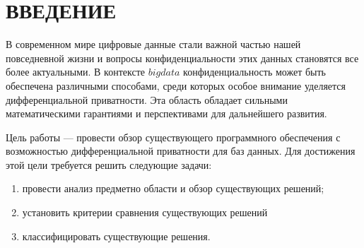 \chapter*{ВВЕДЕНИЕ}
 В современном мире цифровые данные стали важной частью нашей повседневной жизни и вопросы конфиденциальности этих данных становятся все более актуальными.
 В контексте $big data$ конфиденциальность может быть обеспечена различными способами, среди которых особое внимание уделяется дифференциальной приватности.
 Эта область обладает сильными математическими гарантиями и перспективами для дальнейшего развития.
 
Цель работы --- провести обзор существующего программного обеспечения с возможностью
дифференциальной приватности для баз данных.
Для достижения этой цели требуется решить следующие задачи:
\begin{enumerate}[label*=---]
	\item провести анализ предметно области и обзор существующих решений;
	\item установить критерии сравнения существующих решений
	\item классифицировать существующие решения.
\end{enumerate}